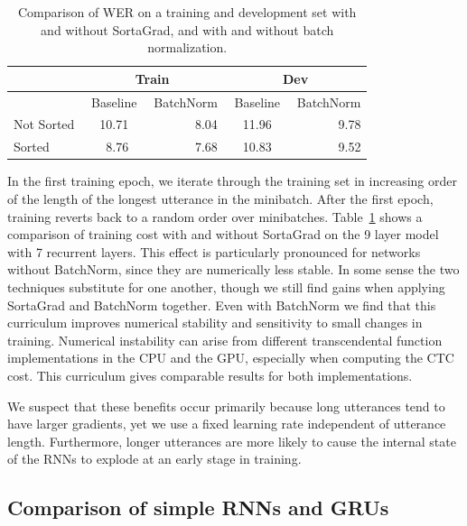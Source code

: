 \documentclass{article}
\begin{document}
\begin{table}
\centering
\begin{tabular}{l  r r r  r  r r r  r}
\toprule
& \multicolumn{4}{c}{Train} & \multicolumn{4}{c}{Dev}\\
\midrule
& \multicolumn{3}{c}{Baseline} &  BatchNorm & \multicolumn{3}{c}{Baseline} & BatchNorm\\
\midrule
Not Sorted & & 10.71 & & 8.04 & & 11.96 & & 9.78 \\
Sorted     & & 8.76 & & 7.68 & & 10.83 & & 9.52 \\
\bottomrule
\end{tabular}
\caption{Comparison of WER on a training and development set with and without SortaGrad, and with and without batch normalization.}
\label{table:sorting}
\end{table}

In the first training epoch, we iterate through the training set in increasing order of the length of the longest utterance in the minibatch. After the first epoch, training reverts back to a random order over minibatches. Table~\ref{table:sorting} shows a comparison of training cost with and without SortaGrad on the 9 layer model with 7 recurrent layers. This effect is particularly pronounced for networks without BatchNorm, since they are numerically less stable. In some sense the two techniques substitute for one another, though we still find gains when applying SortaGrad and BatchNorm together. Even with BatchNorm we find that this curriculum improves numerical stability and sensitivity to small changes in training. Numerical instability can arise from different transcendental function implementations in the CPU and the GPU, especially when computing the CTC cost. This curriculum gives comparable results for both implementations.

We suspect that these benefits occur primarily because long utterances tend to have larger gradients, yet we use a fixed learning rate independent of utterance length. Furthermore, longer utterances are more likely to cause the internal state of the RNNs to explode at an early stage in training.

\subsection{Comparison of simple RNNs and GRUs}
\label{subsection:recurrent}
\end{document}
